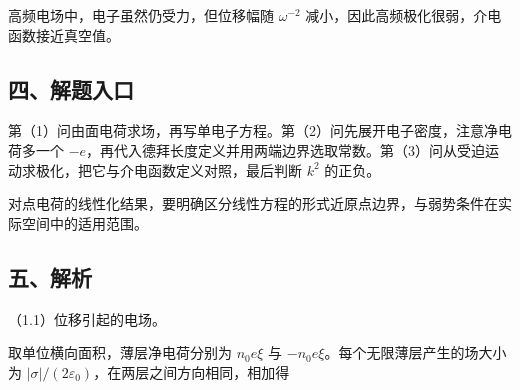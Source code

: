 \documentclass[12pt,a4paper,fontset=fandol]{ctexart}
\begin{document}
\begin{center}
\begin{minipage}{\linewidth}
\centering\begingroup
{}
\ifdim\wd\diagrambox>.88\linewidth
\sbox{\diagrambox}{\resizebox{.88\linewidth}{!}{\usebox{\diagrambox}}}
\fi
\ifdim\ht\diagrambox>.29\textheight
\resizebox{!}{.29\textheight}{\usebox{\diagrambox}}
\else\usebox{\diagrambox}\fi
\par{}
\endgroup\end{minipage}
\end{center}

高频电场中，电子虽然仍受力，但位移幅随 \(\omega^{-2}\)
减小，因此高频极化很弱，介电函数接近真空值。

\subsection{四、解题入口}\label{ux56dbux89e3ux9898ux5165ux53e3-5}

第（1）问由面电荷求场，再写单电子方程。第（2）问先展开电子密度，注意净电荷多一个
\(-e\)，再代入德拜长度定义并用两端边界选取常数。第（3）问从受迫运动求极化，把它与介电函数定义对照，最后判断
\(k^2\) 的正负。

对点电荷的线性化结果，要明确区分线性方程的形式近原点边界，与弱势条件在实际空间中的适用范围。

\subsection{五、解析}\label{ux4e94ux89e3ux6790-5}

（1.1）位移引起的电场。

取单位横向面积，薄层净电荷分别为 \(n_0e\xi\) 与
\(-n_0e\xi\)。每个无限薄层产生的场大小为
\(|\sigma|/(2\varepsilon_0)\)，在两层之间方向相同，相加得
\end{document}

